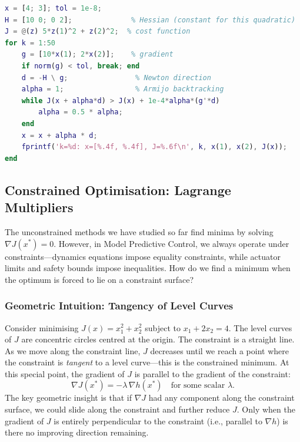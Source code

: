 \begin{lstlisting}[language=Matlab,caption={Newton's method with Armijo backtracking for a 2D quadratic.}]
x = [4; 3]; tol = 1e-8;
H = [10 0; 0 2];              % Hessian (constant for this quadratic)
J = @(z) 5*z(1)^2 + z(2)^2;  % cost function
for k = 1:50
    g = [10*x(1); 2*x(2)];    % gradient
    if norm(g) < tol, break; end
    d = -H \ g;                % Newton direction
    alpha = 1;                 % Armijo backtracking
    while J(x + alpha*d) > J(x) + 1e-4*alpha*(g'*d)
        alpha = 0.5 * alpha;
    end
    x = x + alpha * d;
    fprintf('k=%d: x=[%.4f, %.4f], J=%.6f\n', k, x(1), x(2), J(x));
end
\end{lstlisting}

\subsection{Constrained Optimisation: Lagrange Multipliers}

The unconstrained methods we have studied so far find minima by solving $\nabla J(x^*) = 0$. However, in Model Predictive Control, we always operate under constraints---dynamics equations impose equality constraints, while actuator limits and safety bounds impose inequalities. How do we find a minimum when the optimum is forced to lie on a constraint surface?

\subsubsection{Geometric Intuition: Tangency of Level Curves}

Consider minimising $J(x) = x_1^2 + x_2^2$ subject to $x_1 + 2x_2 = 4$. The level curves of $J$ are concentric circles centred at the origin. The constraint is a straight line. As we move along the constraint line, $J$ decreases until we reach a point where the constraint is \emph{tangent} to a level curve---this is the constrained minimum. At this special point, the gradient of $J$ is parallel to the gradient of the constraint:
\[
\nabla J(x^*) = -\lambda \,\nabla h(x^*) \quad \text{for some scalar } \lambda.
\]
The key geometric insight is that if $\nabla J$ had any component along the constraint surface, we could slide along the constraint and further reduce $J$. Only when the gradient of $J$ is entirely perpendicular to the constraint (i.e., parallel to $\nabla h$) is there no improving direction remaining.


